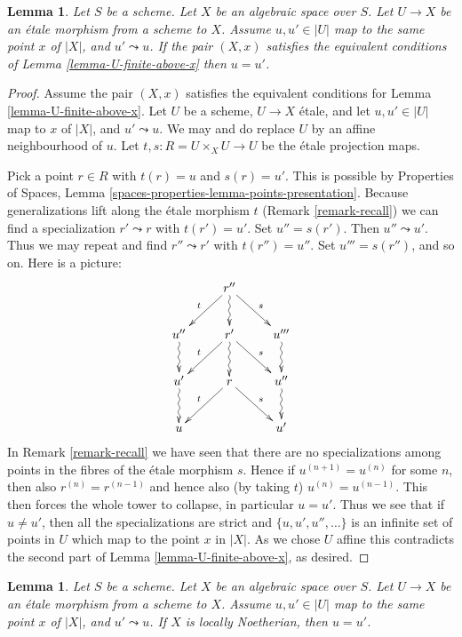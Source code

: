 \documentclass{stacks-project}
\theoremstyle{plain}
\newtheorem{lemma}[subsection]{Lemma}
\theoremstyle{definition}
\theoremstyle{remark}
\numberwithin{equation}{subsection}
\begin{document}
\begin{lemma}
\label{lemma-no-specializations-map-to-same-point}
Let $S$ be a scheme.
Let $X$ be an algebraic space over $S$.
Let $U \to X$ be an \'etale morphism from a scheme to $X$.
Assume $u, u' \in |U|$ map to the same point $x$ of $|X|$, and
$u' \leadsto u$. If the pair $(X, x)$ satisfies the
equivalent conditions of
Lemma \ref{lemma-U-finite-above-x}
then $u = u'$.
\end{lemma}

\begin{proof}
Assume the pair $(X, x)$ satisfies the
equivalent conditions for Lemma \ref{lemma-U-finite-above-x}.
Let $U$ be a scheme, $U \to X$ \'etale, and
let $u, u' \in |U|$ map to $x$ of $|X|$, and
$u' \leadsto u$. We may and do replace $U$ by an affine
neighbourhood of $u$. Let $t, s : R = U \times_X U \to U$
be the \'etale projection maps.

\medskip\noindent
Pick a point $r \in R$ with $t(r) = u$ and $s(r) = u'$.
This is possible by
Properties of Spaces,
Lemma \ref{spaces-properties-lemma-points-presentation}.
Because generalizations lift along the \'etale morphism $t$
(Remark \ref{remark-recall}) we can find a specialization $r' \leadsto r$ with
$t(r') = u'$. Set $u'' = s(r')$. Then $u'' \leadsto u'$.
Thus we may repeat and find $r'' \leadsto r'$ with
$t(r'') = u''$. Set $u''' = s(r'')$, and so on.
Here is a picture:
$$
\xymatrix{
& r'' \ar[rd]^s \ar[ld]_t \ar@{~>}[d] & \\
u'' \ar@{~>}[d] & r' \ar[rd]^s \ar[ld]_t \ar@{~>}[d] & u''' \ar@{~>}[d] \\
u' \ar@{~>}[d] & r \ar[rd]^s \ar[ld]_t & u'' \ar@{~>}[d] \\
u & & u'
}
$$
In Remark \ref{remark-recall} we have seen that there are no specializations
among points in the fibres of the \'etale morphism $s$. Hence if
$u^{(n + 1)} = u^{(n)}$ for some $n$, then also $r^{(n)} = r^{(n - 1)}$ and
hence also (by taking $t$) $u^{(n)} = u^{(n - 1)}$. This then forces the
whole tower to collapse, in particular $u = u'$. Thus we see that if
$u \not = u'$, then all the specializations are strict and
$\{u, u', u'', \ldots\}$ is an infinite set of points in $U$ which map to the
point $x$ in $|X|$. As we chose $U$ affine this contradicts the second part of
Lemma \ref{lemma-U-finite-above-x}, as desired.
\end{proof}

\begin{lemma}
\label{lemma-no-specializations-map-to-same-point-Noetherian}
Let $S$ be a scheme. Let $X$ be an algebraic space over $S$.
Let $U \to X$ be an \'etale morphism from a scheme to $X$.
Assume $u, u' \in |U|$ map to the same point $x$ of $|X|$, and
$u' \leadsto u$. If $X$ is locally Noetherian, then $u = u'$.
\end{lemma}
\end{document}
